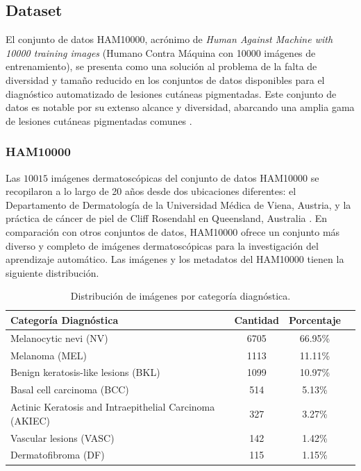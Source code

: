 \subsection{Dataset}

El conjunto de datos HAM10000, acrónimo de \textit{Human Against Machine with 10000 training images} (Humano Contra Máquina con 10000 imágenes de entrenamiento), se presenta como una solución al problema de la falta de diversidad y tamaño reducido en los conjuntos de datos disponibles para el diagnóstico automatizado de lesiones cutáneas pigmentadas. Este conjunto de datos es notable por su extenso alcance y diversidad, abarcando una amplia gama de lesiones cutáneas pigmentadas comunes . 

\subsubsection*{HAM10000}

Las $10015$ imágenes dermatoscópicas del conjunto de datos HAM10000 se recopilaron a lo largo de 20 años desde dos ubicaciones diferentes: el Departamento de Dermatología de la Universidad Médica de Viena, Austria, y la práctica de cáncer de piel de Cliff Rosendahl en Queensland, Australia . En comparación con otros conjuntos de datos, HAM10000 ofrece un conjunto más diverso y completo de imágenes dermatoscópicas para la investigación del aprendizaje automático. Las imágenes y los metadatos del HAM10000  tienen la siguiente distribución.

\begin{table}[H]
   \centering
   \small
   \begin{tabular}{lccc}
   \hline
   \textbf{Categoría Diagnóstica} & \textbf{Cantidad} & \textbf{Porcentaje} \\
   \hline
   Melanocytic nevi (NV) & 6705 & 66.95\%  \\
   Melanoma (MEL) & 1113 & 11.11\% \\
   Benign keratosis-like lesions (BKL) & 1099 & 10.97\% \\
   Basal cell carcinoma (BCC) & 514 & 5.13\% \\
   Actinic Keratosis and Intraepithelial Carcinoma (AKIEC) & 327                         & 3.27\%              \\
   Vascular lesions (VASC) & 142 & 1.42\%  \\
   Dermatofibroma  (DF) & 115 & 1.15\% \\
   \hline
   \end{tabular}
   \caption{Distribución de imágenes por categoría diagnóstica.}
   \label{tab:ham10000_distribution}
\end{table}   
   
